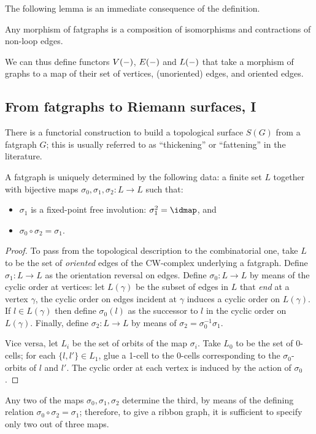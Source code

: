 The following lemma is an immediate consequence of the definition.
\begin{lemma}\label{lemma:contraction1}
  Any morphism of fatgraphs is a composition of isomorphisms and
  contractions of non-loop edges.
\end{lemma}

We can thus define functors $V(-)$, $E(-)$ and $L(-)$
that take a morphism of graphs to a map of their set of vertices,
(unoriented) edges, and oriented edges.

\subsection{From fatgraphs to Riemann surfaces, I}
\label{sec:rg-to-surfaces}

There is a functorial construction to build a topological surface
$S(G)$ from a fatgraph $G$; this is usually referred to as
``thickening'' or ``fattening'' in the literature.

\begin{lemma}
  A fatgraph is uniquely determined by the following data: a
  finite set $L$ together with bijective maps $\sigma_0, \sigma_1, \sigma_2: L \to L$ such
  that:
  \begin{itemize}
  \item $\sigma_1$ is a fixed-point free involution: $\sigma_1^2 = \idmap$, and
  \item $\sigma_0 \circ \sigma_2 = \sigma_1$.
  \end{itemize}
\end{lemma}
\begin{proof}
  To pass from the topological description to the combinatorial one,
  take $L$ to be the set of \emph{oriented} edges of the CW-complex
  underlying a fatgraph.  Define $\sigma_1:L\to L$ as the orientation
  reversal on edges.  Define $\sigma_0:L\to L$ by means of the cyclic order
  at vertices: let $L(\gamma)$ be the subset of edges in $L$ that
  \emph{end} at a vertex $\gamma$, the cyclic order on edges incident at
  $\gamma$ induces a cyclic order on $L(\gamma)$.  If $l\in L(\gamma)$ then
  define $\sigma_0(l)$ as the successor to $l$ in the cyclic order on
  $L(\gamma)$.  Finally, define $\sigma_2: L \to L$ by means of
  $\sigma_2=\sigma_0^{-1}\sigma_1$.

  Vice versa, let $L_i$ be the set of orbits of the map $\sigma_i$.  Take
  $L_0$ to be the set of 0-cells; for each $\{l,l'\} \in L_1$, glue a
  1-cell to the 0-cells corresponding to the $\sigma_0$-orbits of $l$ and
  $l'$.  The cyclic order at each vertex is induced by the action of
  $\sigma_0$.
\end{proof}
Any two of the maps $\sigma_0, \sigma_1, \sigma_2$ determine the third, by means of
the defining relation $\sigma_0 \circ \sigma_2 = \sigma_1$; therefore, to give a ribbon
graph, it is sufficient to specify only two out of three maps.

